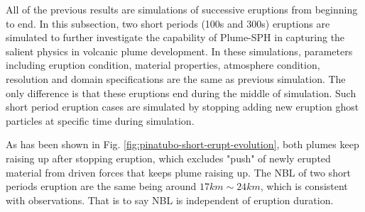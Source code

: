 All of the previous results are simulations of successive eruptions from beginning to end. In this subsection, two short periods (100s and 300s) eruptions are simulated to further investigate the capability of Plume-SPH in capturing the salient physics in volcanic plume development. In these simulations, parameters including eruption condition, material properties, atmosphere condition, resolution and domain specifications are the same as previous simulation. The only difference is that these eruptions end during the middle of simulation. Such short period eruption cases are simulated by stopping adding new eruption ghost particles at specific time during simulation.

As has been shown in Fig. \ref{fig:pinatubo-short-erupt-evolution}, both plumes keep raising up after stopping eruption, which excludes "push" of newly erupted material from driven forces that keeps plume raising up. The NBL of two short periods eruption are the same being around $17 km \sim 24 km$, which is consistent with observations. That is to say NBL is independent of eruption duration.

